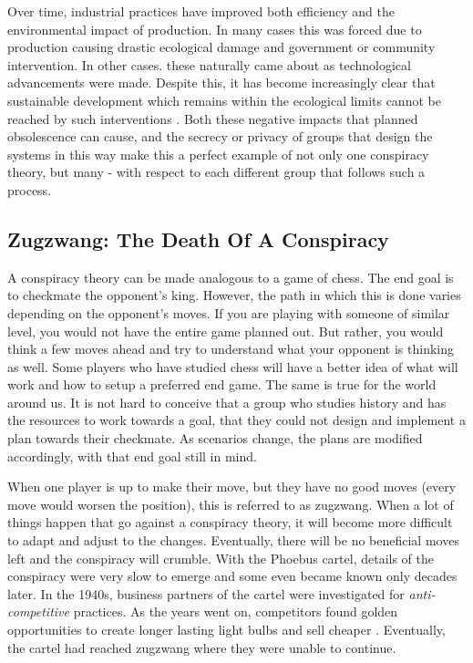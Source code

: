 \documentclass[10pt, a4paper, twocolumn]{book}
\begin{document}
Over time, industrial practices have improved both efficiency and the environmental impact of production. In many cases this was forced due to production causing drastic ecological damage and government or community intervention. In other cases. these naturally came about as technological advancements were made. Despite this, it has become increasingly clear that sustainable development which remains within the ecological limits cannot be reached by such interventions \citep{LiveBetterbyConsumingLess}. Both these negative impacts that planned obsolescence can cause, and the secrecy or privacy of groups that design the systems in this way make this a perfect example of not only one conspiracy theory, but many - with respect to each different group that follows such a process.

\subsection{Zugzwang: The Death Of A Conspiracy}

A conspiracy theory can be made analogous to a game of chess. The end goal is to checkmate the opponent's king. However, the path in which this is done varies depending on the opponent's moves. If you are playing with someone of similar level, you would not have the entire game planned out. But rather, you would think a few moves ahead and try to understand what your opponent is thinking as well. Some players who have studied chess will have a better idea of what will work and how to setup a preferred end game. The same is true for the world around us. It is not hard to conceive that a group who studies history and has the resources to work towards a goal, that they could not design and implement a plan towards their checkmate. As scenarios change, the plans are modified accordingly, with that end goal still in mind. 

When one player is up to make their move, but they have no good moves (every move would worsen the position), this is referred to as zugzwang. When a lot of things happen that go against a conspiracy theory, it will become more difficult to adapt and adjust to the changes. Eventually, there will be no beneficial moves left and the conspiracy will crumble. With the Phoebus cartel, details of the conspiracy were very slow to emerge and some even became known only decades later. In the 1940s, business partners of the cartel were investigated for \textit{anti-competitive} practices. As the years went on, competitors found golden opportunities to create longer lasting light bulbs and sell cheaper \citep{IEEELightbulbConspiracy}. Eventually, the cartel had reached zugzwang where they were unable to continue.
\end{document}

